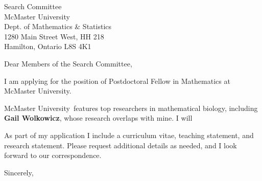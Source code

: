 \documentclass[11pt,a4paper]{letter}
\begin{document}

\def\School{McMaster University}

\begin{letter}
{Search Committee\\
McMaster University\\
Dept. of Mathematics \& Statistics\\
1280 Main Street West, HH 218\\
Hamilton, Ontario L8S 4K1}


\opening{Dear Members of the Search Committee,}

I am applying for the position of Postdoctoral Fellow in Mathematics at \School. 



\School~features top researchers in mathematical biology, including \textbf{Gail Wolkowicz}, whose research overlaps with mine. I will 



As part of my application I include a curriculum vitae, teaching statement, and research statement. Please request additional details as needed, and I look forward to our correspondence.

\closing{Sincerely,}
\end{letter}
\end{document}
